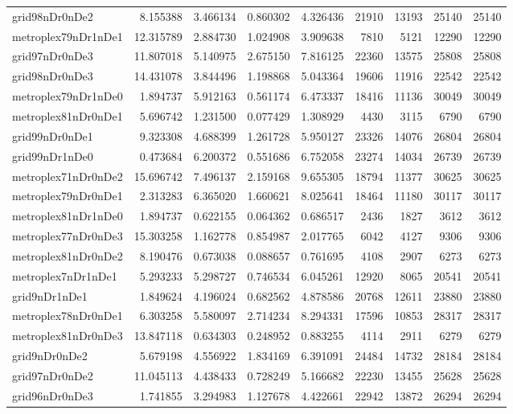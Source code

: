 \begin{longtable}{|l|r|r|r|r|r|r|r|r|}
grid98nDr0nDe2 & 8.155388 & 3.466134 & 0.860302 & 4.326436 & 21910 & 13193 & 25140 & 25140 \\
metroplex79nDr1nDe1 & 12.315789 & 2.884730 & 1.024908 & 3.909638 & 7810 & 5121 & 12290 & 12290 \\
grid97nDr0nDe3 & 11.807018 & 5.140975 & 2.675150 & 7.816125 & 22360 & 13575 & 25808 & 25808 \\
grid98nDr0nDe3 & 14.431078 & 3.844496 & 1.198868 & 5.043364 & 19606 & 11916 & 22542 & 22542 \\
metroplex79nDr1nDe0 & 1.894737 & 5.912163 & 0.561174 & 6.473337 & 18416 & 11136 & 30049 & 30049 \\
metroplex81nDr0nDe1 & 5.696742 & 1.231500 & 0.077429 & 1.308929 & 4430 & 3115 & 6790 & 6790 \\
grid99nDr0nDe1 & 9.323308 & 4.688399 & 1.261728 & 5.950127 & 23326 & 14076 & 26804 & 26804 \\
grid99nDr1nDe0 & 0.473684 & 6.200372 & 0.551686 & 6.752058 & 23274 & 14034 & 26739 & 26739 \\
metroplex71nDr0nDe2 & 15.696742 & 7.496137 & 2.159168 & 9.655305 & 18794 & 11377 & 30625 & 30625 \\
metroplex79nDr0nDe1 & 2.313283 & 6.365020 & 1.660621 & 8.025641 & 18464 & 11180 & 30117 & 30117 \\
metroplex81nDr1nDe0 & 1.894737 & 0.622155 & 0.064362 & 0.686517 & 2436 & 1827 & 3612 & 3612 \\
metroplex77nDr0nDe3 & 15.303258 & 1.162778 & 0.854987 & 2.017765 & 6042 & 4127 & 9306 & 9306 \\
metroplex81nDr0nDe2 & 8.190476 & 0.673038 & 0.088657 & 0.761695 & 4108 & 2907 & 6273 & 6273 \\
metroplex7nDr1nDe1 & 5.293233 & 5.298727 & 0.746534 & 6.045261 & 12920 & 8065 & 20541 & 20541 \\
grid9nDr1nDe1 & 1.849624 & 4.196024 & 0.682562 & 4.878586 & 20768 & 12611 & 23880 & 23880 \\
metroplex78nDr0nDe1 & 6.303258 & 5.580097 & 2.714234 & 8.294331 & 17596 & 10853 & 28317 & 28317 \\
metroplex81nDr0nDe3 & 13.847118 & 0.634303 & 0.248952 & 0.883255 & 4114 & 2911 & 6279 & 6279 \\
grid9nDr0nDe2 & 5.679198 & 4.556922 & 1.834169 & 6.391091 & 24484 & 14732 & 28184 & 28184 \\
grid97nDr0nDe2 & 11.045113 & 4.438433 & 0.728249 & 5.166682 & 22230 & 13455 & 25628 & 25628 \\
grid96nDr0nDe3 & 1.741855 & 3.294983 & 1.127678 & 4.422661 & 22942 & 13872 & 26294 & 26294 \\

\end{longtable}

